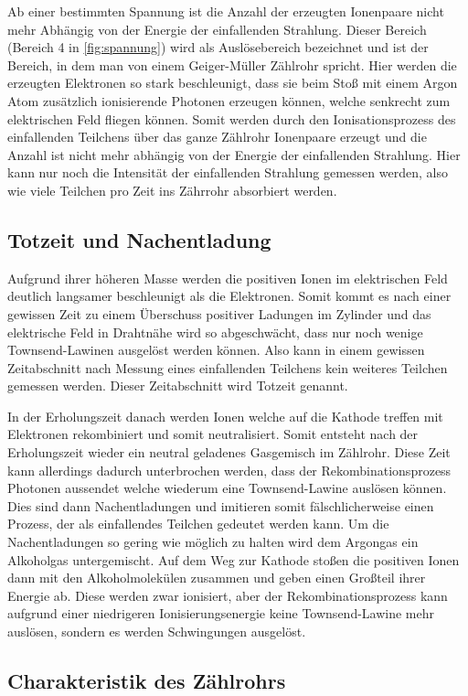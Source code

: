 Ab einer bestimmten Spannung ist die Anzahl der erzeugten Ionenpaare nicht mehr Abhängig von der Energie der einfallenden Strahlung.
Dieser Bereich (Bereich 4 in \autoref{fig:spannung}) wird als Auslösebereich bezeichnet und ist der Bereich, in dem man von einem Geiger-Müller Zählrohr spricht.
Hier werden die erzeugten Elektronen so stark beschleunigt, dass sie beim Stoß mit einem Argon Atom zusätzlich ionisierende Photonen erzeugen können, welche senkrecht zum elektrischen Feld fliegen können.
Somit werden durch den Ionisationsprozess des einfallenden Teilchens über das ganze Zählrohr Ionenpaare erzeugt und die Anzahl ist nicht mehr abhängig von der Energie der einfallenden Strahlung.
Hier kann nur noch die Intensität der einfallenden Strahlung gemessen werden, also wie viele Teilchen pro Zeit ins Zährrohr absorbiert werden.

\subsection{Totzeit und Nachentladung}
\label{ssec:totzeit}

Aufgrund ihrer höheren Masse werden die positiven Ionen im elektrischen Feld deutlich langsamer beschleunigt als die Elektronen.
Somit kommt es nach einer gewissen Zeit zu einem Überschuss positiver Ladungen im Zylinder und das elektrische Feld in Drahtnähe wird so abgeschwächt, dass nur noch wenige Townsend-Lawinen ausgelöst werden können.
Also kann in einem gewissen Zeitabschnitt nach Messung eines einfallenden Teilchens kein weiteres Teilchen gemessen werden.
Dieser Zeitabschnitt wird Totzeit genannt.

In der Erholungszeit danach werden Ionen welche auf die Kathode treffen mit Elektronen rekombiniert und somit neutralisiert.
Somit entsteht nach der Erholungszeit wieder ein neutral geladenes Gasgemisch im Zählrohr.
Diese Zeit kann allerdings dadurch unterbrochen werden, dass der Rekombinationsprozess Photonen aussendet welche wiederum eine Townsend-Lawine auslösen können.
Dies sind dann Nachentladungen und imitieren somit fälschlicherweise einen Prozess, der als einfallendes Teilchen gedeutet werden kann.
Um die Nachentladungen so gering wie möglich zu halten wird dem Argongas ein Alkoholgas untergemischt.
Auf dem Weg zur Kathode stoßen die positiven Ionen dann mit den Alkoholmolekülen zusammen und geben einen Großteil ihrer Energie ab.
Diese werden zwar ionisiert, aber der Rekombinationsprozess kann aufgrund einer niedrigeren Ionisierungsenergie keine Townsend-Lawine mehr auslösen, sondern es werden Schwingungen ausgelöst.

\subsection{Charakteristik des Zählrohrs}
\label{ssec:charakteristik}